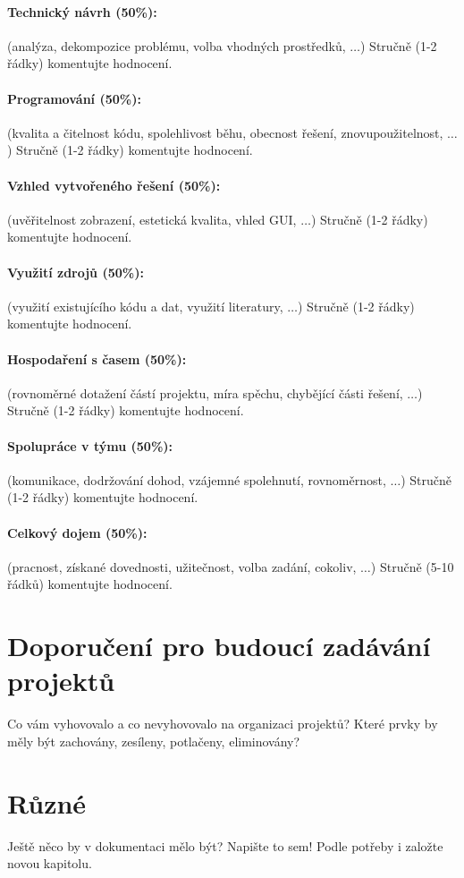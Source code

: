 \documentclass[11pt,a4paper]{article}
\begin{document}
\paragraph{Technický návrh (50\%):} (analýza, dekompozice problému, volba
vhodných prostředků, $\ldots$) 
Stručně (1-2 řádky) komentujte hodnocení. 

\paragraph{Programování (50\%):} (kvalita a čitelnost kódu, spolehlivost běhu,
obecnost řešení, znovupoužitelnost, $\ldots$)
Stručně (1-2 řádky) komentujte hodnocení. 

\paragraph{Vzhled vytvořeného řešení (50\%):} (uvěřitelnost zobrazení,
estetická kvalita, vhled GUI, $\ldots$)
Stručně (1-2 řádky) komentujte hodnocení. 

\paragraph{Využití zdrojů (50\%):} (využití existujícího kódu a dat, využití
literatury, $\ldots$)
Stručně (1-2 řádky) komentujte hodnocení. 

\paragraph{Hospodaření s časem (50\%):} (rovnoměrné dotažení částí projektu,
míra spěchu, chybějící části řešení, $\ldots$)
Stručně (1-2 řádky) komentujte hodnocení. 

\paragraph{Spolupráce v týmu (50\%):} (komunikace, dodržování dohod, vzájemné
spolehnutí, rovnoměrnost, $\ldots$)
Stručně (1-2 řádky) komentujte hodnocení. 

\paragraph{Celkový dojem (50\%):} (pracnost, získané dovednosti, užitečnost,
volba zadání, cokoliv, $\ldots$)
Stručně (5-10 řádků) komentujte hodnocení. 

\section{Doporučení pro budoucí zadávání projektů}

Co vám vyhovovalo a co nevyhovovalo na organizaci projektů? Které prvky by měly
být zachovány, zesíleny, potlačeny, eliminovány?

\section{Různé}

Ještě něco by v dokumentaci mělo být? Napište to sem! Podle potřeby i založte
novou kapitolu.
\end{document}
